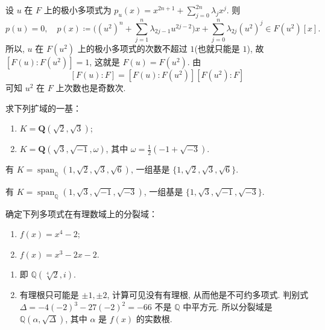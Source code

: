 \begin{solution}
    设 $u$ 在 $F$ 上的极小多项式为 $p_{u}(x)=x^{2n+1}+\sum_{j=0}^{2n}\lambda_{j}x^{j}$. 
    则 
        \[
            p(u)=0,\quad p(x)\coloneqq \Big((u^{2})^{n}+\sum_{j=1}^{n}\lambda_{2j-1}u^{2j-2}\Big)x+\sum_{j=0}^{n}\lambda_{2j}(u^{2})^{j}\in F(u^{2})[x].
        \]
    所以, $u$ 在 $F(u^{2})$ 上的极小多项式的次数不超过 $1$(也就只能是 $1$), 故 $[F(u):F(u^{2})]=1$, 这就是 $F(u)=F(u^{2})$. 由 
        \[
            [F(u):F]=[F(u):F(u^{2})] [F(u^{2}):F]
        \]
    可知 $u^{2}$ 在 $F$ 上次数也是奇数次.
\end{solution}

\setcounter{pb}{6}
\begin{problem}
    求下列扩域的一基：
    \begin{enumerate}[label=(\roman*)]
        \item $ K = \mathbf{Q}(\sqrt{2}, \sqrt{3}) $;
        \item $ K = \mathbf{Q}(\sqrt{3}, \sqrt{-1}, \omega) $, 其中 $ \omega = \frac{1}{2}(-1 + \sqrt{-3}) $.
    \end{enumerate}
\end{problem}

\begin{solution}
    有 $K=\operatorname{span}_{\mathbb{Q}}(1,\sqrt{2},\sqrt{3},\sqrt{6})$, 一组基是 $\{1,\sqrt{2},\sqrt{3},\sqrt{6}\}$.
    \par 有 $K=\operatorname{span}_{\mathbb{Q}}(1,\sqrt{3},\sqrt{-1},\sqrt{-3})$, 一组基是 $\{1,\sqrt{3},\sqrt{-1},\sqrt{-3}\}$.
\end{solution}

\setcounter{pb}{10}
\begin{problem}
    确定下列多项式在有理数域上的分裂域：
    \begin{enumerate}[label=(\roman*)]
        \item $ f(x) = x^4 - 2 $;
        \item $ f(x) = x^3 - 2x - 2 $.
    \end{enumerate}
\end{problem}

\begin{solution}
\begin{enumerate}[label=(\roman*)]
    \item 即 $\mathbb{Q}(\sqrt[4]{2},i)$.
    \item 有理根只可能是 $\pm1,\pm2$, 计算可见没有有理根, 从而他是不可约多项式. 判别式 $\Delta=-4(-2)^3-27(-2)^2=-66$ 不是 $\mathbb{Q}$ 中平方元. 
    所以分裂域是 $\mathbb{Q}(\alpha,\sqrt{\Delta})$, 其中 $\alpha$ 是 $f(x)$ 的实数根.
\end{enumerate}
\end{solution}

